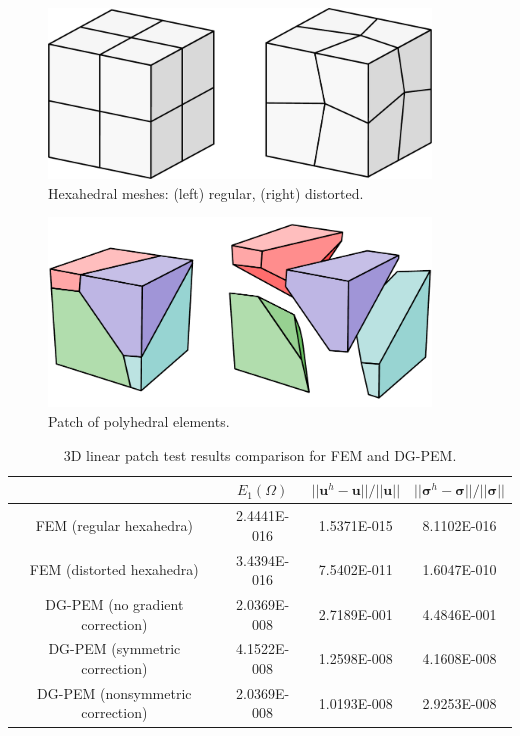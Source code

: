 \begin{figure}[!h]
    \centering
    \includegraphics[width=4.0in]{figures/hexahedral_patch_meshes.pdf}
    	\caption{Hexahedral meshes: (left) regular, (right) distorted.}
    \label{fig:hexahedral_patch_meshes}
\end{figure}

\begin{figure}[!h]
    \centering
    \includegraphics[width=4.0in]{figures/polyhedral_patch_mesh.pdf}
    	\caption{Patch of polyhedral elements.}
    \label{fig:polyhedral_patch_mesh}
\end{figure}

\begin{table}[!ht]
  \begin{center}
    \begin{tabular}{| c || c | c | c |}
    \hline
           & $E_1 (\Omega)$ & $||\mathbf{u}^h - \mathbf{u}|| / ||\mathbf{u}||$ & $||\boldsymbol{\sigma}^h - \boldsymbol{\sigma}|| / ||\boldsymbol{\sigma}||$ \\ \hline \hline
    FEM (regular hexahedra) & 2.4441E-016 & 1.5371E-015 & 8.1102E-016 \\ \hline
    FEM (distorted hexahedra) & 3.4394E-016 & 7.5402E-011 & 1.6047E-010 \\ \hline
    DG-PEM (no gradient correction) & 2.0369E-008 & 2.7189E-001 & 4.4846E-001 \\ \hline
    DG-PEM (symmetric correction) & 4.1522E-008 & 1.2598E-008 & 4.1608E-008 \\ \hline
    DG-PEM (nonsymmetric correction) & 2.0369E-008 & 1.0193E-008 & 2.9253E-008 \\
    \hline
    \end{tabular}
    \caption{3D linear patch test results comparison for FEM and DG-PEM.}
    \vspace{-5pt}
    \label{tab:linear_patch_test_3d}
    \vspace{-25pt}
  \end{center}
\end{table}

